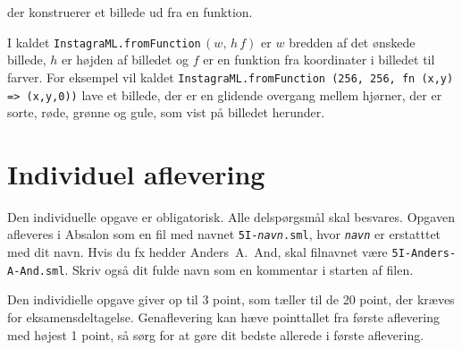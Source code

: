 \documentclass[a4paper,12pt]{article}
\begin{document}
\begin{enumerate}[{5G}1]
der konstruerer et billede ud fra en funktion.

I kaldet
\lstinline{InstagraML.fromFunction}\,$(w,\,h\,f)$ er $w$ bredden af
det ønskede billede, $h$ er højden af billedet og $f$ er en funktion
fra koordinater i billedet til farver.  For eksempel vil
kaldet
\lstinline{InstagraML.fromFunction (256, 256, fn (x,y) => (x,y,0))}
lave et billede, der er en glidende overgang mellem hjørner, der er
sorte, røde, grønne og gule, som vist på billedet herunder.

\vspace{3ex}

\begin{center}
\end{center}

\end{enumerate}


\newpage
\section{Individuel aflevering}
\label{sec:indiv-aflev}
Den individuelle opgave er obligatorisk.  Alle delspørgsmål skal
besvares.  Opgaven afleveres i Absalon som en fil med navnet
\texttt{5I-\textit{navn}.sml}, hvor \texttt{\textit{navn}} er
erstatttet med dit navn. Hvis du fx hedder Anders~A.~And, skal
filnavnet være \texttt{5I-Anders-A-And.sml}. Skriv også dit fulde navn
som en kommentar i starten af filen.

Den individielle opgave giver op til 3 point, som tæller til de 20
point, der kræves for eksamensdeltagelse.  Genaflevering kan hæve
pointtallet fra første aflevering med højest 1 point, så sørg for at
gøre dit bedste allerede i første aflevering.

\vspace{1ex}
\end{document}
